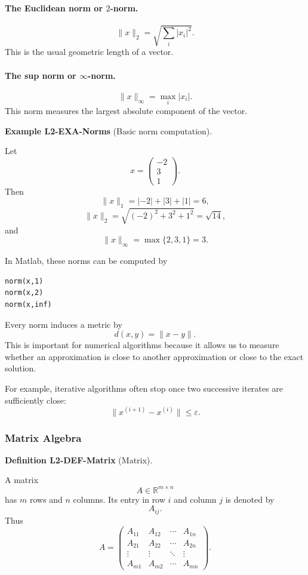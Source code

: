 \documentclass[10pt, letterpaper]{article}
\newcommand{\R}{\mathbb{R}}
\newcommand{\CustomHeading}[3]{%
  \par\medskip\noindent%
  \textbf{#1 #2} \textnormal{(#3)}.\enskip%
}
\newenvironment{DEF}[2]{\CustomHeading{Definition}{#1}{#2}}{}
\newenvironment{EXA}[2]{\CustomHeading{Example}{#1}{#2}}{}
\begin{document}
\paragraph{The Euclidean norm or \(2\)-norm.}
\[
\|x\|_2=\sqrt{\sum_i |x_i|^2}.
\]
This is the usual geometric length of a vector.

\paragraph{The sup norm or \(\infty\)-norm.}
\[
\|x\|_\infty=\max_i |x_i|.
\]
This norm measures the largest absolute component of the vector.

\begin{EXA}{L2-EXA-Norms}{Basic norm computation}
Let
\[
x=
\begin{pmatrix}
-2\\
3\\
1
\end{pmatrix}.
\]
Then
\[
\|x\|_1=|-2|+|3|+|1|=6,
\]
\[
\|x\|_2=\sqrt{(-2)^2+3^2+1^2}=\sqrt{14},
\]
and
\[
\|x\|_\infty=\max\{2,3,1\}=3.
\]
\end{EXA}

In Matlab, these norms can be computed by
\begin{verbatim}
norm(x,1)
norm(x,2)
norm(x,inf)
\end{verbatim}

Every norm induces a metric by
\[
d(x,y)=\|x-y\|.
\]
This is important for numerical algorithms because it allows us to measure whether an approximation is close to another approximation or close to the exact solution.

For example, iterative algorithms often stop once two successive iterates are sufficiently close:
\[
\|x^{(i+1)}-x^{(i)}\|\leq \varepsilon.
\]

\subsubsection{Matrix Algebra}

\begin{DEF}{L2-DEF-Matrix}{Matrix}
A matrix
\[
A\in\R^{m\times n}
\]
has \(m\) rows and \(n\) columns. Its entry in row \(i\) and column \(j\) is denoted by
\[
A_{ij}.
\]
Thus
\[
A=
\begin{pmatrix}
A_{11} & A_{12} & \cdots & A_{1n}\\
A_{21} & A_{22} & \cdots & A_{2n}\\
\vdots & \vdots & \ddots & \vdots\\
A_{m1} & A_{m2} & \cdots & A_{mn}
\end{pmatrix}.
\]
\end{DEF}
\end{document}
